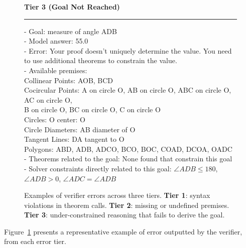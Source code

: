 \begin{figure}[!t]
{\begin{minipage}{0.99\textwidth}
    \textbf{Tier 3 (Goal Not Reached)} \\
    \hrule\vspace{0.5em}
    - Goal: measure of angle ADB \\
    - Model answer: 55.0 \\
    - Error: Your proof doesn't uniquely determine the value. You need to use additional theorems to constrain the value. \\
    - Available premises: \\
      Collinear Points: AOB, BCD \\
      Cocircular Points: A on circle O, AB on circle O, ABC on circle O, AC on circle O, \\
      B on circle O, BC on circle O, C on circle O \\
      Circles: O center: O \\
      Circle Diameters: AB diameter of O \\
      Tangent Lines: DA tangent to O \\
      Polygons: ABD, ADB, ADCO, BCO, BOC, COAD, DCOA, OADC \\
    - Theorems related to the goal: None found that constrain this goal \\
    - Solver constraints directly related to this goal: 
$\angle ADB \leq 180$, \quad 
$\angle ADB > 0$, \quad 
$\angle ADC = \angle ADB$ \\


    \end{minipage}
    }
    \caption{
        Examples of verifier errors across three tiers. \textbf{Tier 1}: syntax violations in theorem calls. \textbf{Tier 2}: missing or undefined premises. \textbf{Tier 3}: under-constrained reasoning that fails to derive the goal.
    }
    \label{tab:tiered_verifier_errors}
\end{figure}


Figure~\ref{tab:tiered_verifier_errors} presents a representative example of error outputted by the verifier, from each error tier.
 



